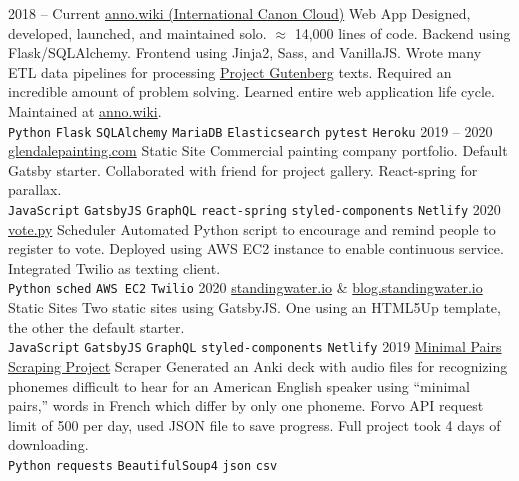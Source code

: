 \documentclass[9pt]{developercv} %
\begin{document}
\begin{entrylist}
	\entry
		{2018 -- Current}
        {{\href{https://github.com/malan88/icc}{anno.wiki (International Canon Cloud)}}}
		{Web App}
        {Designed, developed, launched, and maintained solo. $\approx$ 14,000
        lines of code. Backend using Flask/SQLAlchemy. Frontend using Jinja2,
        Sass, and VanillaJS. Wrote many ETL data pipelines for processing
        {\href{https://gutenberg.org}{Project Gutenberg}} texts. Required an
        incredible amount of problem solving. Learned entire web application
        life cycle. Maintained at {\href{https://anno.wiki}{anno.wiki}}.
        \\
        \texttt{Python}\slashsep
        \texttt{Flask}\slashsep
        \texttt{SQLAlchemy}\slashsep
        \texttt{MariaDB}\slashsep
        \texttt{Elasticsearch}\slashsep
        \texttt{pytest}\slashsep
        \texttt{Heroku}
        }
	\entry
		{2019 -- 2020}
        {{\href{https://glendalepainting.netlify.app}{glendalepainting.com}}}
		{Static Site}
        {Commercial painting company portfolio. Default Gatsby starter.
        Collaborated with friend for project gallery. React-spring for parallax.
        \\
        \texttt{JavaScript}\slashsep
        \texttt{GatsbyJS}\slashsep
        \texttt{GraphQL}\slashsep
        \texttt{react-spring}\slashsep
        \texttt{styled-components}\slashsep
        \texttt{Netlify}
        }
	\entry
		{2020}
        {\href{https://github.com/malan88/vote}{vote.py}}
		{Scheduler}
        {
            Automated Python script to encourage and remind people to register
            to vote. Deployed using AWS EC2 instance to enable continuous
            service. Integrated Twilio as texting client.
        \\
        \texttt{Python}\slashsep
        \texttt{sched}\slashsep
        \texttt{AWS EC2}\slashsep
        \texttt{Twilio}
        }
    \entry
        {2020}
        {
            {\href{https://standingwater.io}{standingwater.io}}
            \& {\href{https://blog.standingwater.io}{blog.standingwater.io}}
        }
        {Static Sites}
        {Two static sites using GatsbyJS. One using an HTML5Up
        template, the other the default starter.
        \\
        \texttt{JavaScript}\slashsep
        \texttt{GatsbyJS}\slashsep
        \texttt{GraphQL}\slashsep
        \texttt{styled-components}\slashsep
        \texttt{Netlify}
        }
	\entry
		{2019}
        {
            \href{https://github.com/malan88/minimalpairs}
            {Minimal Pairs Scraping Project}
        }
		{Scraper}
        {Generated an Anki deck with audio files for recognizing phonemes
        difficult to hear for an American English speaker using “minimal pairs,”
        words in French which differ by only one phoneme. Forvo API request
        limit of 500 per day, used JSON file to save progress. Full project took
        4 days of downloading.
        \\
        \texttt{Python}\slashsep
        \texttt{requests}\slashsep
        \texttt{BeautifulSoup4}\slashsep
        \texttt{json}\slashsep
        \texttt{csv}
        }
\end{entrylist}
\end{document}
